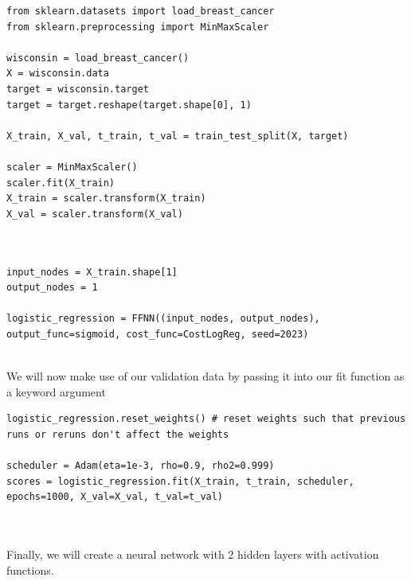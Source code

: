 \documentclass{beamer}
\begin{document}
\begin{frame}
\begin{verbatim}
from sklearn.datasets import load_breast_cancer
from sklearn.preprocessing import MinMaxScaler

wisconsin = load_breast_cancer()
X = wisconsin.data
target = wisconsin.target
target = target.reshape(target.shape[0], 1)

X_train, X_val, t_train, t_val = train_test_split(X, target)

scaler = MinMaxScaler()
scaler.fit(X_train)
X_train = scaler.transform(X_train)
X_val = scaler.transform(X_val)



\end{verbatim}








\begin{verbatim}
input_nodes = X_train.shape[1]
output_nodes = 1

logistic_regression = FFNN((input_nodes, output_nodes), output_func=sigmoid, cost_func=CostLogReg, seed=2023)


\end{verbatim}


We will now make use of our validation data by passing it into our fit function as a keyword argument








\begin{verbatim}
logistic_regression.reset_weights() # reset weights such that previous runs or reruns don't affect the weights

scheduler = Adam(eta=1e-3, rho=0.9, rho2=0.999)
scores = logistic_regression.fit(X_train, t_train, scheduler, epochs=1000, X_val=X_val, t_val=t_val)



\end{verbatim}


Finally, we will create a neural network with 2 hidden layers with activation functions.












\end{frame}
\end{document}
